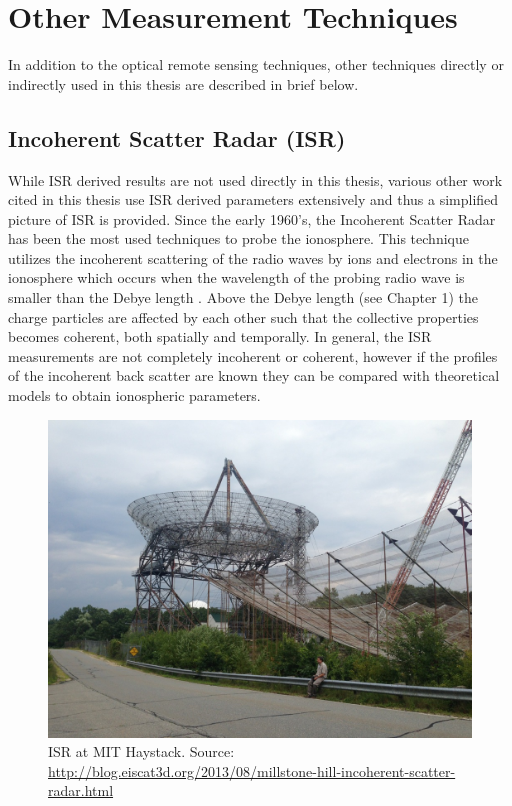 \documentclass[crop=false,class=mitthesis,oneside,font=12pt]{standalone}
\begin{document}
\section{Other Measurement Techniques}
In addition to the optical remote sensing techniques, other techniques directly or indirectly used in this thesis are described in brief below. 

\subsection{Incoherent Scatter Radar (ISR)}
While ISR derived results are not used directly in this thesis, various other work cited in this thesis use ISR derived parameters extensively and thus a simplified picture of ISR is provided. Since the early 1960's, the Incoherent Scatter Radar has been the most used techniques to probe the ionosphere. This technique utilizes the incoherent scattering of the radio waves by ions and electrons in the ionosphere which occurs when the wavelength of the probing radio wave is smaller than the Debye length \citep{dougherty1963theory}. Above the Debye length (see Chapter 1) the charge particles are affected by each other such that the collective properties becomes coherent, both spatially and temporally. In general, the ISR measurements are not completely incoherent or coherent, however if the profiles of the incoherent back scatter are known they can be compared with theoretical models to obtain ionospheric parameters. 
\begin{figure}[H]
	\centering\includegraphics[width=30pc]{isr.jpg}
	\caption{ISR at MIT Haystack. Source: \url{http://blog.eiscat3d.org/2013/08/millstone-hill-incoherent-scatter-radar.html}}
	\label{fig:isr_a}
\end{figure}
\end{document}
